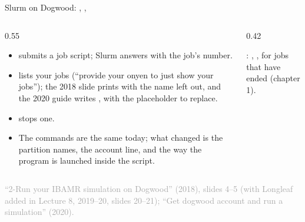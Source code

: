 \documentclass[aspectratio=169,11pt]{beamer}
\newcommand{\sourcecredit}[1]{\vfill\begin{flushright}\tiny\textcolor{DarkGray}{#1}\end{flushright}}
\begin{document}
\begin{frame}{Slurm on Dogwood: , , }
\label{fr:slurmdw}
\begin{columns}[T,onlytextwidth]
\begin{column}{0.55\textwidth}
\small
\begin{itemize}\setlength{\itemsep}{3pt}
  \item {} submits a job script; Slurm answers with the job's number.
  \item {} lists your jobs (``provide your onyen to just show your jobs''); the 2018 slide prints  with the name left out, and the 2020 guide writes , with the placeholder to replace.
  \item {} stops one.
  \item The commands are the same today; what changed is the partition names, the account line, and the way the program is launched inside the script.
\end{itemize}
\end{column}
\begin{column}{0.42\textwidth}
\begin{punchbox}
\small {}: , ,  for jobs that have ended (chapter 1).
\end{punchbox}
\end{column}
\end{columns}
\sourcecredit{``2-Run your IBAMR simulation on Dogwood'' (2018), slides 4--5 (with Longleaf added in Lecture 8, 2019--20, slides 20--21); ``Get dogwood account and run a simulation'' (2020).}
\end{frame}
\end{document}
